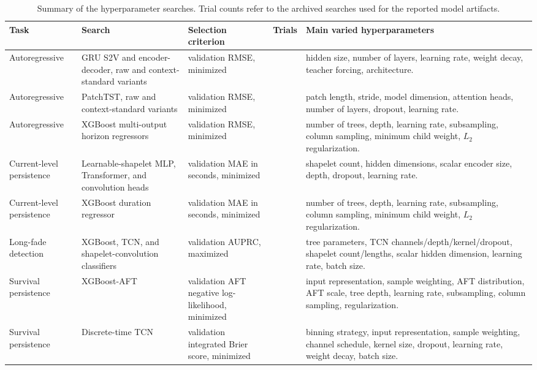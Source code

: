 \begin{table}[htbp]
  \centering
  \caption{Summary of the hyperparameter searches. Trial counts refer to the archived searches used for the reported model artifacts.}
  \label{tab:appendix-grid-search-summary}
  \scriptsize
  \setlength{\tabcolsep}{3pt}
  \renewcommand{\arraystretch}{1.15}
  \begin{tabular}{
    @{}
    >{\raggedright\arraybackslash}p{}
    >{\raggedright\arraybackslash}p{}
    >{\raggedright\arraybackslash}p{}
    >{\raggedleft\arraybackslash}p{}
    >{\raggedright\arraybackslash}p{}
    @{}
  }
    \toprule
    Task & Search & Selection criterion & Trials & Main varied hyperparameters \\
    \midrule
    Autoregressive
      & GRU S2V and encoder-decoder, raw and context-standard variants
      & validation RMSE, minimized
      & 576
      & hidden size, number of layers, learning rate, weight decay, teacher forcing, architecture. \\
    Autoregressive
      & PatchTST, raw and context-standard variants
      & validation RMSE, minimized
      & 1728
      & patch length, stride, model dimension, attention heads, number of layers, dropout, learning rate. \\
    Autoregressive
      & XGBoost multi-output horizon regressors
      & validation RMSE, minimized
      & 2304
      & number of trees, depth, learning rate, subsampling, column sampling, minimum child weight, \(L_2\) regularization. \\
    Current-level persistence
      & Learnable-shapelet MLP, Transformer, and convolution heads
      & validation MAE in seconds, minimized
      & 648
      & shapelet count, hidden dimensions, scalar encoder size, depth, dropout, learning rate. \\
    Current-level persistence
      & XGBoost duration regressor
      & validation MAE in seconds, minimized
      & 1152
      & number of trees, depth, learning rate, subsampling, column sampling, minimum child weight, \(L_2\) regularization. \\
    Long-fade detection
      & XGBoost, TCN, and shapelet-convolution classifiers
      & validation AUPRC, maximized
      & 8928
      & tree parameters, TCN channels/depth/kernel/dropout, shapelet count/lengths, scalar hidden dimension, learning rate, batch size. \\
    Survival persistence
      & XGBoost-AFT
      & validation AFT negative log-likelihood, minimized
      & 1920
      & input representation, sample weighting, AFT distribution, AFT scale, tree depth, learning rate, subsampling, column sampling, regularization. \\
    Survival persistence
      & Discrete-time TCN
      & validation integrated Brier score, minimized
      & 1620
      & binning strategy, input representation, sample weighting, channel schedule, kernel size, dropout, learning rate, weight decay, batch size. \\
    \bottomrule
  \end{tabular}
\end{table}

